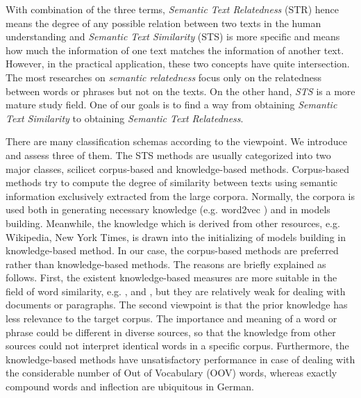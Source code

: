 With combination of the three terms, \textit{Semantic Text Relatedness} (STR) hence means the degree of any possible relation between two texts in the human understanding and \textit{Semantic Text Similarity} (STS) is more specific and means how much the information of one text matches the information of another text. However, in the practical application, these two concepts have quite intersection. The most researches on \textit{semantic relatedness} \citep{rohrbach2010helps, gracia2008web, gabrilovich2007computing} focus only on the relatedness between words or phrases but not on the texts. On the other hand, \textit{STS} is a more mature study field. One of our goals is to find a way from obtaining \textit{Semantic Text Similarity} to obtaining \textit{Semantic Text Relatedness}. 

There are many classification schemas according to the viewpoint. We introduce and assess three of them. The STS methods are usually categorized into two major classes, scilicet corpus-based and knowledge-based methods. Corpus-based methods try to compute the degree of similarity between texts using semantic information exclusively extracted from the large corpora. Normally, the corpora is used both in generating necessary knowledge (e.g. word2vec \cite{mikolov2013efficient}) and in models building. Meanwhile, the knowledge which is derived from other resources, e.g. Wikipedia, New York Times, is drawn into the initializing of models building in knowledge-based method. In our case, the corpus-based methods are preferred rather than knowledge-based methods. The reasons are briefly explained as follows. First, the existent knowledge-based measures are more suitable in the field of word similarity, e.g. \cite{jiang1997semantic}, \cite{strube2006wikirelate} and \cite{Agirre2009ta}, but they are relatively weak for dealing with documents or paragraphs. The second viewpoint is that the prior knowledge has less relevance to the target corpus. The importance and meaning of a word or phrase could be different in diverse sources, so that the knowledge from other sources could not interpret identical words in a specific corpus. Furthermore, the knowledge-based methods have unsatisfactory performance in case of dealing with the considerable number of Out of Vocabulary (OOV) words, whereas exactly compound words and inflection are ubiquitous in German. 

